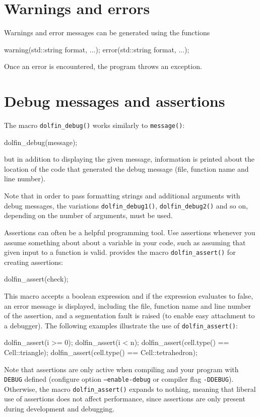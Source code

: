 \section{Warnings and errors}

Warnings and error messages can be generated using the functions
\begin{code}
warning(std::string format, ...);
error(std::string format, ...);
\end{code}
Once an error is encountered, the program throws an exception.

\section{Debug messages and assertions}

The macro \texttt{dolfin\_debug()} works similarly to
\texttt{message()}:
\begin{code}
dolfin_debug(message);
\end{code}
but in addition to displaying the given message, information is printed about
the location of the code that generated the debug message (file,
function name and line number).

Note that in order to pass formatting strings and additional arguments
with debug messages, the variations \texttt{dolfin\_debug1()},
\texttt{dolfin\_debug2()} and so on, depending on the number of
arguments, must be used.

Assertions can often be a helpful programming tool. Use assertions
whenever you assume something about about a variable in your code,
such as assuming that given input to a function is valid. \dolfin{}
provides the macro \texttt{dolfin\_assert()} for creating assertions:
\begin{code}
dolfin_assert(check);
\end{code}
This macro accepts a boolean expression and if the expression
evaluates to false, an error message is displayed, including the
file, function name and line number of the assertion, and a
segmentation fault is raised (to enable easy attachment to a
debugger). The following examples illustrate the use of
\texttt{dolfin\_assert()}:
\begin{code}
dolfin_assert(i >= 0);
dolfin_assert(i < n);
dolfin_assert(cell.type() == Cell::triangle);
dolfin_assert(cell.type() == Cell::tetrahedron);
\end{code}
Note that assertions are only active when compiling
\dolfin{} and your program with \texttt{DEBUG} defined (configure
option \texttt{--enable-debug} or compiler flag \texttt{-DDEBUG}).
Otherwise, the macro \texttt{dolfin\_assert()} expands to nothing,
meaning that liberal use of assertions does not affect performance,
since assertions are only present during development and
debugging.

